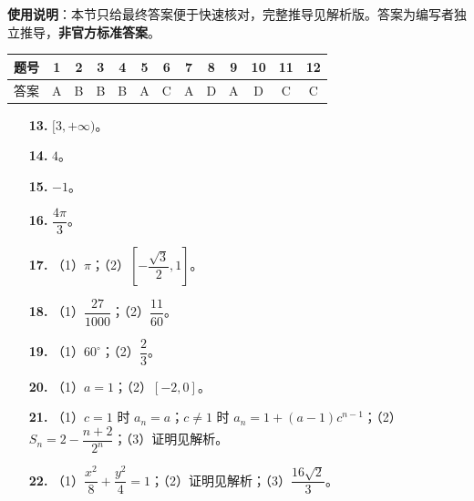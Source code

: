 
\begin{gknotice}
\textbf{使用说明}：本节只给最终答案便于快速核对，完整推导见解析版。答案为编写者独立推导，\textbf{非官方标准答案}。
\end{gknotice}

\begin{center}\begin{tabular}{ccccccccccccc}
\toprule
题号 & 1 & 2 & 3 & 4 & 5 & 6 & 7 & 8 & 9 & 10 & 11 & 12 \\
\midrule
答案 & A & B & B & B & A & C & A & D & A & D & C & C \\
\bottomrule
\end{tabular}\end{center}

\begin{itemize}[leftmargin=2.6em]
  \item[\textbf{13.}] $[3,+\infty)$。
  \item[\textbf{14.}] $4$。
  \item[\textbf{15.}] $-1$。
  \item[\textbf{16.}] $\dfrac{4\pi}3$。
\end{itemize}

\begin{itemize}[leftmargin=2.6em]
  \item[\textbf{17.}] （1）$\pi$；（2）$\left[-\dfrac{\sqrt3}2,1\right]$。
  \item[\textbf{18.}] （1）$\dfrac{27}{1000}$；（2）$\dfrac{11}{60}$。
  \item[\textbf{19.}] （1）$60^\circ$；（2）$\dfrac23$。
  \item[\textbf{20.}] （1）$a=1$；（2）$[-2,0]$。
  \item[\textbf{21.}] （1）$c=1$ 时 $a_n=a$；$c\neq1$ 时 $a_n=1+(a-1)c^{n-1}$；（2）$S_n=2-\dfrac{n+2}{2^n}$；（3）证明见解析。
  \item[\textbf{22.}] （1）$\dfrac{x^2}8+\dfrac{y^2}4=1$；（2）证明见解析；（3）$\dfrac{16\sqrt2}3$。
\end{itemize}

